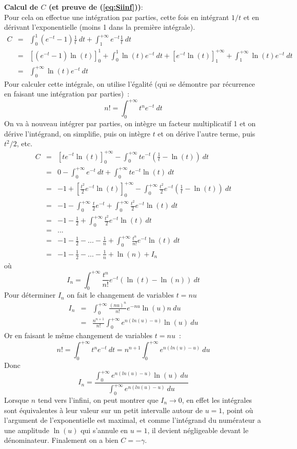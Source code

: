 \documentclass[a4paper,11pt]{article}
\begin{document}
{\bf Calcul de $C$ (et preuve de (\ref{eq:Siinf}))}:\\
Pour cela on effectue une intégration par parties, cette fois en intégrant $1/t$
et en dérivant l'exponentielle (moins 1 dans la première intégrale).
\begin{eqnarray*}
 C&=&\int_0^{1}(e^{-t}-1)\frac{1}{t} \ dt + \int_1^{+\infty} e^{-t} \frac{1}{t} \ dt\\
&=&[(e^{-t}-1)\ln(t)]_0^1 +\int_0^1 \ln(t) e^{-t} \ dt + [e^{-t} \ln(t)]_1^{+\infty}
+\int_1^{+\infty} \ln(t) e^{-t} \ dt \\
&=& \int_0^{+\infty} \ln(t) e^{-t} \ dt
\end{eqnarray*}
Pour calculer cette intégrale, on utilise
l'égalité (qui se démontre par récurrence en faisant une 
intégration par parties)~:
\[ n!= \int_0^{+\infty}t^n e^{-t} \ dt \]
On va à nouveau intégrer par parties,
on intègre un facteur multiplicatif 1 
et on dérive l'intégrand, on simplifie, puis
on intègre $t$ et on dérive l'autre terme, puis $t^2/2$, etc. 
\begin{eqnarray*}
 C&=&[te^{-t} \ln(t)]_0^{+\infty} - \int_0^{+\infty} t e^{-t}(\frac{1}{t}-\ln(t)) \ dt \\
&=& 0 - \int_0^{+\infty} e^{-t} \ dt + \int_0^{+\infty} t e^{-t} \ln(t) \ dt \\
&=& -1 + [\frac{t^2}{2}e^{-t} \ln(t)]_0^{+\infty} 
- \int_0^{+\infty} \frac{t^2}{2} e^{-t}(\frac{1}{t}-\ln(t)) \ dt \\
&=& -1 - \int_0^{+\infty} \frac{t}{2} e^{-t} +  \int_0^{+\infty} \frac{t^2}{2} e^{-t} \ln(t) \ dt \\
&=& -1 - \frac{1}{2} +  \int_0^{+\infty} \frac{t^2}{2} e^{-t} \ln(t) \ dt \\
&=& ...\\
&=& -1 - \frac{1}{2} - ... -  \frac{1}{n} + \int_0^{+\infty} \frac{t^n}{n!} e^{-t} \ln(t) \ dt \\
&=& -1 - \frac{1}{2} - ... -  \frac{1}{n} + \ln(n) + I_n
\end{eqnarray*}
où
\[ I_n=\int_0^{+\infty} \frac{t^n}{n!} e^{-t} (\ln(t)-\ln(n)) \ dt \]
Pour déterminer $I_n$ on fait le changement de variables $t=nu$
\begin{eqnarray*}
 I_n&=&\int_0^{+\infty} \frac{(nu)^n}{n!} e^{-nu} \ln(u) n\ du \\
&=& \frac{n^{n+1}}{n!} \int_0^{+\infty} e^{n(ln(u)-u)} \ln(u) \ du 
\end{eqnarray*}
Or en faisant le même changement de variables $t=nu$~:
\[ n!= \int_0^{+\infty}t^n e^{-t} \ dt = n^{n+1} \int_0^{+\infty} e^{n(ln(u)-u)} \ du
\]
Donc
\[ I_n= \frac{\int_0^{+\infty} e^{n(ln(u)-u)} \ln(u) \ du}
{\int_0^{+\infty} e^{n(ln(u)-u)} \ du}  \]
Lorsque $n$ tend vers l'infini, on peut montrer que $I_n \rightarrow 0$, en effet les intégrales
sont équivalentes à leur valeur sur un petit intervalle autour de $u=1$, point où l'argument
de l'exponentielle est maximal, 
et comme l'intégrand du numérateur a une amplitude $\ln(u)$ qui s'annule en $u=1$, 
il devient négligeable devant le dénominateur. Finalement on a bien $C=-\gamma$.
\end{document}
